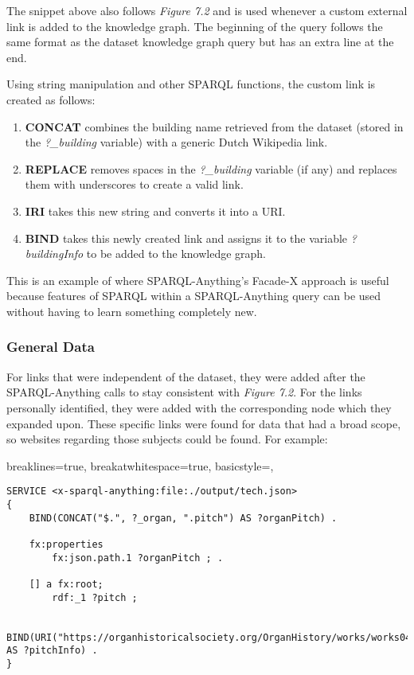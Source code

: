 The snippet above also follows \textit{Figure 7.2} and is used whenever a custom external link is added to the knowledge graph. The beginning of the query follows the same format as the dataset knowledge graph query but has an extra line at the end.

Using string manipulation and other SPARQL functions, the custom link is created as follows:
\begin{enumerate}
    \item \textbf{CONCAT} combines the building name retrieved from the dataset (stored in the \textit{?\_building} variable) with a generic Dutch Wikipedia link.
    \item \textbf{REPLACE} removes spaces in the \textit{?\_building} variable (if any) and replaces them with underscores to create a valid link. 
    \item \textbf{IRI} takes this new string and converts it into a URI.
    \item \textbf{BIND} takes this newly created link and assigns it to the variable \textit{?buildingInfo} to be added to the knowledge graph. 
\end{enumerate}

This is an example of where SPARQL-Anything's Facade-X approach is useful because  features of SPARQL within a SPARQL-Anything query can be used without having to learn something completely new. 

\subsubsection{General Data}
\hspace*{0.5cm} For links that were independent of the dataset, they were added after the SPARQL-Anything calls to stay consistent with \textit{Figure 7.2}. For the links personally identified, they were added with the corresponding node which they expanded upon. These specific links were found for data that had a broad scope, so websites regarding those subjects could be found. For example:

\lstset
{
    breaklines=true,
    breakatwhitespace=true,
    basicstyle=\ttfamily,
}
\begin{lstlisting}
SERVICE <x-sparql-anything:file:./output/tech.json>
{
    BIND(CONCAT("$.", ?_organ, ".pitch") AS ?organPitch) .

    fx:properties
        fx:json.path.1 ?organPitch ; .

    [] a fx:root; 
        rdf:_1 ?pitch ;
    
    BIND(URI("https://organhistoricalsociety.org/OrganHistory/works/works04.htm") AS ?pitchInfo) .
} 
\end{lstlisting}

